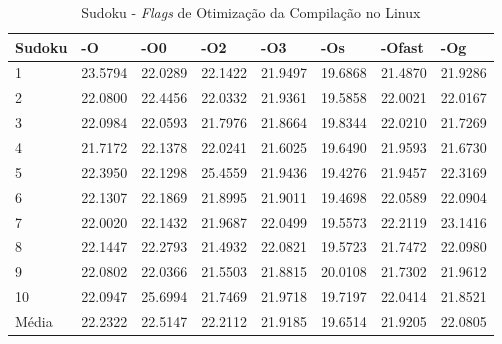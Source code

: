 \begin{apendicesenv}
\begin{table}[!ht]
\centering
\tiny
\caption{Sudoku - \textit{Flags} de Otimização da Compilação no Linux}
\label{tab:otimizacao_compilacao:linux:sudoku}
\begin{tabular}{llllllll}
\textbf{Sudoku}            & \textbf{-O}  & \textbf{-O0}   & \textbf{-O2} & \textbf{-O3} & \textbf{-Os} & \textbf{-Ofast} & \textbf{-Og} \\ \toprule
1                          & 23.5794      & 22.0289        & 22.1422      & 21.9497      & 19.6868      & 21.4870         & 21.9286    \\ 
2                          & 22.0800      & 22.4456        & 22.0332      & 21.9361      & 19.5858      & 22.0021         & 22.0167    \\ 
3                          & 22.0984      & 22.0593        & 21.7976      & 21.8664      & 19.8344      & 22.0210         & 21.7269    \\ 
4                          & 21.7172      & 22.1378        & 22.0241      & 21.6025      & 19.6490      & 21.9593         & 21.6730    \\ 
5                          & 22.3950      & 22.1298        & 25.4559      & 21.9436      & 19.4276      & 21.9457         & 22.3169    \\ 
6                          & 22.1307      & 22.1869        & 21.8995      & 21.9011      & 19.4698      & 22.0589         & 22.0904    \\ 
7                          & 22.0020      & 22.1432        & 21.9687      & 22.0499      & 19.5573      & 22.2119         & 23.1416    \\ 
8                          & 22.1447      & 22.2793        & 21.4932      & 22.0821      & 19.5723      & 21.7472         & 22.0980    \\ 
9                          & 22.0802      & 22.0366        & 21.5503      & 21.8815      & 20.0108      & 21.7302         & 21.9612    \\ 
10                         & 22.0947      & 25.6994        & 21.7469      & 21.9718      & 19.7197      & 22.0414         & 21.8521    \\ \bottomrule
Média                      & 22.2322      & 22.5147        & 22.2112      & 21.9185      & 19.6514      & 21.9205         & 22.0805    \\ 
\end{tabular}
\end{table}


\end{apendicesenv}
